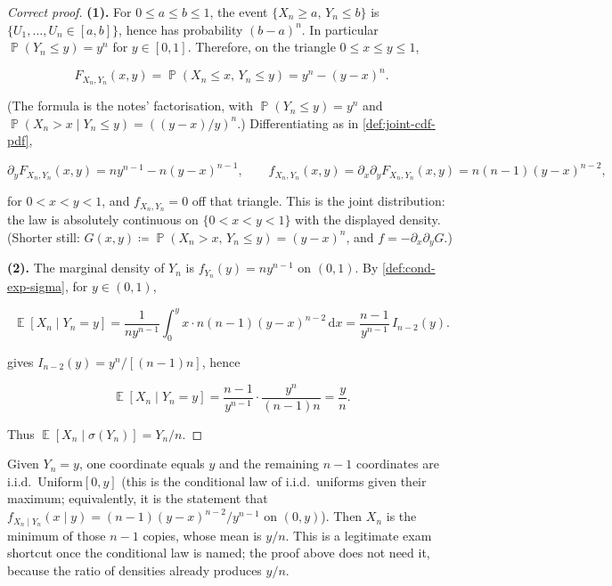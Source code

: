 \documentclass[11pt,a4paper]{article}
\DeclareMathOperator{\E}{\mathbb{E}}
\DeclareMathOperator{\Pbb}{\mathbb{P}}
\begin{document}
\begin{proof}[Correct proof]
\textbf{(1).}
For \( 0\le a\le b\le 1 \), the event \( \{X_{n}\ge a,\,Y_{n}\le b\} \) is \( \{U_{1},\dots,U_{n}\in[a,b]\} \), hence has probability \( (b-a)^{n} \). In particular \( \Pbb(Y_{n}\le y)=y^{n} \) for \( y\in[0,1] \). Therefore, on the triangle \( 0\le x\le y\le 1 \),

\[
F_{X_{n},Y_{n}}(x,y)
=
\Pbb(X_{n}\le x,\,Y_{n}\le y)
=
y^{n}-(y-x)^{n}.
\]

(The formula is the notes' factorisation, with \( \Pbb(Y_{n}\le y)=y^{n} \) and \( \Pbb(X_{n}>x\mid Y_{n}\le y)=((y-x)/y)^{n} \).) Differentiating as in \cref{def:joint-cdf-pdf},

\[
\partial_{y}F_{X_{n},Y_{n}}(x,y)
=
n y^{n-1}-n(y-x)^{n-1},
\qquad
f_{X_{n},Y_{n}}(x,y)
=
\partial_{x}\partial_{y}F_{X_{n},Y_{n}}(x,y)
=
n(n-1)(y-x)^{n-2},
\]

for \( 0<x<y<1 \), and \( f_{X_{n},Y_{n}}=0 \) off that triangle. This is the joint distribution: the law is absolutely continuous on \( \{0<x<y<1\} \) with the displayed density. (Shorter still: \( G(x,y)\coloneqq\Pbb(X_{n}>x,\,Y_{n}\le y)=(y-x)^{n} \), and \( f=-\partial_{x}\partial_{y}G \).)

\textbf{(2).}
The marginal density of \( Y_{n} \) is \( f_{Y_{n}}(y)=n y^{n-1} \) on \( (0,1) \). By \cref{def:cond-exp-sigma}, for \( y\in(0,1) \),

\[
\E[X_{n}\mid Y_{n}=y]
=
\frac{1}{n y^{n-1}}\int_{0}^{y} x\cdot n(n-1)(y-x)^{n-2}\,\mathrm{d}x
=
\frac{n-1}{y^{n-1}}\,I_{n-2}(y).
\]

 gives \( I_{n-2}(y)=y^{n}/[(n-1)n] \), hence

\[
\E[X_{n}\mid Y_{n}=y]
=
\frac{n-1}{y^{n-1}}\cdot\frac{y^{n}}{(n-1)n}
=
\frac{y}{n}.
\]

Thus \( \E[X_{n}\mid\sigma(Y_{n})]=Y_{n}/n \).
\end{proof}

\begin{remark}
\label{rem:unif-given-max}
Given \( Y_{n}=y \), one coordinate equals \( y \) and the remaining \( n-1 \) coordinates are i.i.d.\ Uniform\( [0,y] \) (this is the conditional law of i.i.d.\ uniforms given their maximum; equivalently, it is the statement that \( f_{X_{n}\mid Y_{n}}(x\mid y)=(n-1)(y-x)^{n-2}/y^{n-1} \) on \( (0,y) \)). Then \( X_{n} \) is the minimum of those \( n-1 \) copies, whose mean is \( y/n \). This is a legitimate exam shortcut once the conditional law is named; the proof above does not need it, because the ratio of densities already produces \( y/n \).
\end{remark}
\end{document}
